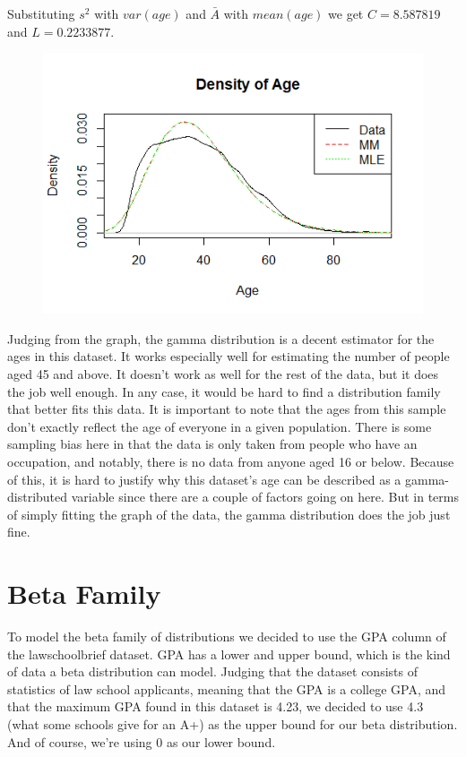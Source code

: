 \documentclass[12pt, a4paper, oneside]{report}
\begin{document}
Substituting $s^2$ with $var(age)$ and $\bar{A}$ with $mean(age)$ we get $C = 8.587819$ and $L = 0.2233877$.

\begin{figure}[h]
  \centering
  \includegraphics[width=\linewidth]{gammaDensityA.png}
\end{figure}

Judging from the graph, the gamma distribution is a decent estimator for the ages in this dataset. It works especially well for estimating the number of people aged 45 and above. It doesn’t work as well for the rest of the data, but it does the job well enough. In any case, it would be hard to find a distribution family that better fits this data. 
It is important to note that the ages from this sample don’t exactly reflect the age of everyone in a given population. There is some sampling bias here in that the data is only taken from people who have an occupation, and notably, there is no data from anyone aged 16 or below. Because of this, it is hard to justify why this dataset’s age can be described as a gamma-distributed variable since there are a couple of factors going on here.
But in terms of simply fitting the graph of the data, the gamma distribution does the job just fine.


















\newpage
\section*{Beta Family}
To model the beta family of distributions we decided to use the GPA column of the lawschoolbrief dataset. GPA has a lower and upper bound, which is the kind of data a beta distribution can model. Judging that the dataset consists of statistics of law school applicants, meaning that the GPA is a college GPA, and that the maximum GPA found in this dataset is 4.23, we decided to use 4.3 (what some schools give for an A+) as the upper bound for our beta distribution. And of course, we’re using 0 as our lower bound. 
\end{document}
